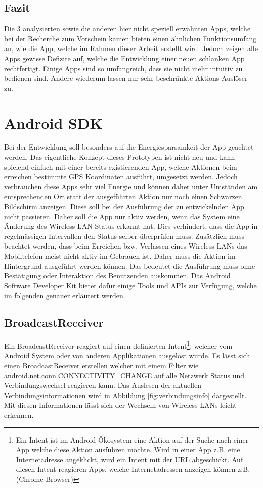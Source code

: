 \subsection{Fazit}
Die 3 analysierten sowie die anderen hier nicht speziell erwähnten Apps, welche bei der Recherche zum Vorschein kamen bieten einen ähnlichen Funktionsumfang an, wie die App, welche im Rahmen dieser Arbeit erstellt wird. Jedoch zeigen alle Apps gewisse Defizite auf, welche die Entwicklung einer neuen schlanken App rechtfertigt. Einige Apps sind so umfangreich, dass sie nicht mehr intuitiv zu bedienen sind. Andere wiederum lassen nur sehr beschränkte Aktions Auslöser zu.


\section{Android SDK}
Bei der Entwicklung soll besonders auf die Energiesparsamkeit der App geachtet werden. Das eigentliche Konzept dieses Prototypen ist nicht neu und kann spielend einfach mit einer bereits existierenden App, welche Aktionen beim erreichen bestimmte GPS Koordinaten ausführt, umgesetzt werden. Jedoch verbrauchen diese Apps sehr viel Energie und können daher unter Umständen am entsprechenden Ort statt der ausgeführten Aktion nur noch einen Schwarzen Bildschirm anzeigen. Diese soll bei der Ausführung der zu entwickelnden App nicht passieren. Daher soll die App nur aktiv werden, wenn das System eine Änderung des Wireless LAN Status erkannt hat. Dies verhindert, dass die App in regelmässigen Intervallen den Status selber überprüfen muss. Zusätzlich muss beachtet werden, dass beim Erreichen bzw. Verlassen eines Wireless LANs das Mobiltelefon meist nicht aktiv im Gebrauch ist. Daher muss die Aktion im Hintergrund ausgeführt werden können. Das bedeutet die Ausführung muss ohne Bestätigung oder Interaktion des Benutzenden auskommen. Das Android Software Developer Kit bietet dafür einige Tools und APIs zur Verfügung, welche im folgenden genauer erläutert werden.

\subsection{BroadcastReceiver}
Ein BroadcastReceiver reagiert auf einen definierten Intent\footnote{Ein Intent ist im Android Ökosystem eine Aktion auf der Suche nach einer App welche diese Aktion ausführen möchte. Wird in einer App z.B. eine Internetadresse angeklickt, wird ein Intent mit der URL abgeschickt. Auf diesen Intent reagieren Apps, welche Internetadressen anzeigen können z.B. (Chrome Browser)}, welcher vom Android System oder von anderen Applikationen ausgelöst wurde. Es lässt sich einen BroadcastReceiver erstellen welcher mit einem Filter wie \glqq android.net.conn.CONNECTIVITY\_CHANGE\grqq{} auf alle Netzwerk Status und Verbindungswechsel reagieren kann. Das Auslesen der aktuellen Verbindungsinformationen wird in Abbildung \ref{fig:verbindungsinfo} dargestellt. Mit diesen Informationen lässt sich der Wechseln von Wireless LANs leicht erkennen.

